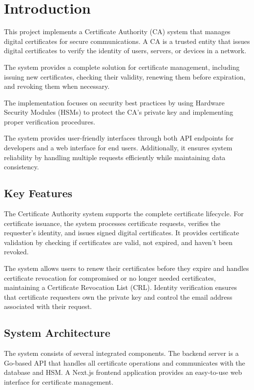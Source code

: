 \chapter{Introduction}
\label{ch:introduction}
This project implements a Certificate Authority (CA) system that manages digital certificates for secure communications. 
A CA is a trusted entity that issues digital certificates to verify the identity of users, servers, or devices in a network.

The system provides a complete solution for certificate management, including issuing new certificates, checking their validity, renewing them before expiration, and revoking them when necessary. 

The implementation focuses on security best practices by using Hardware Security Modules (HSMs) to protect the CA's private key and implementing proper verification procedures.

The system provides user-friendly interfaces through both API endpoints for developers and a web interface for end users. 
Additionally, it ensures system reliability by handling multiple requests efficiently while maintaining data consistency.

\section{Key Features}

The Certificate Authority system supports the complete certificate lifecycle. 
For certificate issuance, the system processes certificate requests, verifies the requester's identity, and issues signed digital certificates. 
It provides certificate validation by checking if certificates are valid, not expired, and haven't been revoked.

The system allows users to renew their certificates before they expire and handles certificate revocation for compromised or no longer needed certificates, maintaining a Certificate Revocation List (CRL). 
Identity verification ensures that certificate requesters own the private key and control the email address associated with their request.

\section{System Architecture}

The system consists of several integrated components. The backend server is a Go-based API that handles all certificate operations and communicates with the database and HSM. 
A Next.js frontend application provides an easy-to-use web interface for certificate management.

